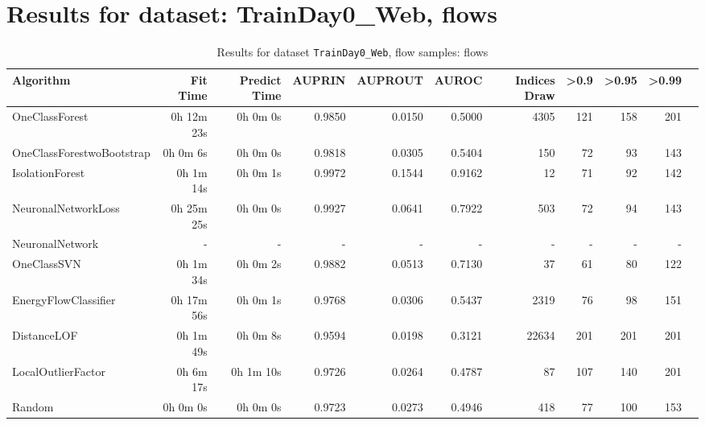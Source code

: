 \documentclass{article}
\begin{document}
\section*{Results for dataset: TrainDay0_Web, flows}
\begin{table}[h!]
\centering
\caption{Results for dataset \texttt{TrainDay0_Web}, flow samples: flows}
\label{tab:trainday0web_flows}
\begin{tabular}{lrrrrrrrrrr}
\toprule
Algorithm & Fit Time & Predict Time & AUPRIN & AUPROUT & AUROC & Indices Draw & >0.9 & >0.95 & >0.99 \\
\midrule
OneClassForest & 0h 12m 23s & 0h 0m 0s & 0.9850 & 0.0150 & 0.5000 & 4305 & 121 & 158 & 201 \\
OneClassForestwoBootstrap & 0h 0m 6s & 0h 0m 0s & 0.9818 & 0.0305 & 0.5404 & 150 & 72 & 93 & 143 \\
IsolationForest & 0h 1m 14s & 0h 0m 1s & 0.9972 & 0.1544 & 0.9162 & 12 & 71 & 92 & 142 \\
NeuronalNetworkLoss & 0h 25m 25s & 0h 0m 0s & 0.9927 & 0.0641 & 0.7922 & 503 & 72 & 94 & 143 \\
NeuronalNetwork & - & - & - & - & - & - & - & - & - \\
OneClassSVN & 0h 1m 34s & 0h 0m 2s & 0.9882 & 0.0513 & 0.7130 & 37 & 61 & 80 & 122 \\
EnergyFlowClassifier & 0h 17m 56s & 0h 0m 1s & 0.9768 & 0.0306 & 0.5437 & 2319 & 76 & 98 & 151 \\
DistanceLOF & 0h 1m 49s & 0h 0m 8s & 0.9594 & 0.0198 & 0.3121 & 22634 & 201 & 201 & 201 \\
LocalOutlierFactor & 0h 6m 17s & 0h 1m 10s & 0.9726 & 0.0264 & 0.4787 & 87 & 107 & 140 & 201 \\
Random & 0h 0m 0s & 0h 0m 0s & 0.9723 & 0.0273 & 0.4946 & 418 & 77 & 100 & 153 \\
\bottomrule
\end{tabular}
\end{table}
\end{document}
